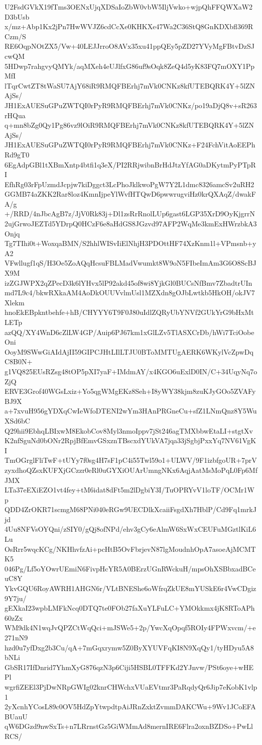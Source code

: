U2FsdGVkX19fTms3OENxUjqXDSaIoZbW0vbW5IljVwko+wjpQhFFQWXaW2D3bUsb
x/mz+Abp1Kx2jPn7HwWVJZ6cdCcXe0KHKXe47Wa2C36StQ8GnKDXbfl369RCzm/S
RE6OqpNOtZX5/Vw+40LEJJrroO8AVx35xu41ppQEy5pZD27YVyMgFBtvDzSJcwQM
5HDwp7rahgvyQMYk/aqMXeh4eUJlfxG86uf9sOqk8ZeQ4d5yK83FQ7mOXY1PpMfI
lTqrCwtZT8tWaSU7AjY68iR9RMQFBErhj7mVk0CNKz8kfUTEBQRK4Y+5lZNAjSs/
JH1ExAUESuGPuZWTQI0rPyR9RMQFBErhj7mVk0CNKz/po19aDjQ8v+sR263rHQua
q+mn8bZg0Qy1Pg86vz9lOiR9RMQFBErhj7mVk0CNKz8kfUTEBQRK4Y+5lZNAjSs/
JH1ExAUESuGPuZWTQI0rPyR9RMQFBErhj7mVk0CNKz+F24FchVitAoEEPhRd9gT0
6EgAdpGBl1tXBmXntp4btfi1q3eX/PI2RRjwibnBrHdJtzYfAG0aDKytmPyPTpRI
EfhRg03rFpUzmdJcpjw7kiDggct3LcPhoJklkwoPgW7Y2L1dmc8326amcSv2uRH2
GGMB74aZKK2Rar8loz4KmnIjpeYlWvfHTQwD6pwwrugviHz0krQXAqZ/dwakFA/g
+/RRD/4nJbcAgB7z/JjV0Rk83j+Dl1zsRrRnolLUp6gast6LGP35XrD9OyKjgrrN
2ujGrwoJEZTd5YDrpQ0HCzF6e8aHdGS8JGzvd97AFP2WqMe3kmExHWrzbkA3Onjq
Tg7TIhi0t+WoxqaBMN/S2hhlWISvIiElNhjH3PDOttHF74XzKnm1l+VPmsnb+yA2
VFwllugf1qS/H3Oe5ZoAQqHcsuFBLMadVwumkt8W9oN5FIbeImAm3G6O8ScBJX9M
izZGJWPX2qZPecD3k6lYHvx5lP92akd45of8wi8YjkGl0BUCsNfBmv7ZbadtrUIn
md7L9c4/bkwRXkaAM4AoDkOUUVvlmUsl1MZXdn8gOJbLwtkb5HkOH/okJV7Xlekm
hnoEkEBpkntbehfe+hB/CHYYY6T9F0J80uIdlZQRyUbYNVf2GUkYrG9bHxMtLETp
azQQ/XY4WnD6cZlLW4GP/Auip6PJ67km1xGlLZv5TlASXCrDb/hWi7TciOobeOni
OoyM9SWwGiAIdAjII59GIPCJHtLIlLTJU0BToMMTUgAERK6WKylVcZpwDqC8B0N+
g1VQ825EUsRZsg48tOP5pXI7yaF+IMdmAY/x4KGO6uExlD0IN/C+34UqyNq7oZjQ
ERVE3Grof40WGsLxiz+Yo5qgWMgEKz8Seh+I8yWY38kjm8zuKJyGOo5ZVAFyBJ9X
a+7xvuH956gYDXqCwIeWfoDTENI2wYm3HAnPRGneCu+sfZ1LNmQnz8Y5WuXSd6bC
Q29hii9EbhqLBIxwM8EkobCov8Myl3nmoIppv7jSt246agTMXbbwEtaLI+stgtXv
K2nfSguNd0bONr2RpjBfEmvGSxznTBscxdYUkVA7jqa33jSgbjPxxYq7NV61VgKI
TmOGrglFliTwF+tUYy7f0sg4H7sF1pC4i55Twl59o1+ULWV/9F1izbfgoUR+7prV
zyxdhoQZsxKUFXjGCzzr0eRl0uGYXiOUArUmngNKx6AqjAatMsMoPqL0Fp6MfJMX
LTa37eEXiEZO1vt4fey+tM6idat8dFt5m2lDgbiY3I/TuOPRYvV1loTF/OCMr1Wp
QDD4ZrOKR71scmgM68PNi040eRGw9UECDlkXcaiiFsgdXh7HblP/Cd9Fq1mrkJjd
4Uu8NFVsOYQni/zSIY0/gQj8ofNPd/ehv3gCy6eAlmW6SxWxCEUFuMGztlKiL6Lu
OsRrr5wqcKCg/NKHhvfzAi+pcHtB5OvFbrjevN87lgMoudnhOpA7asoeAjMCMTK5
046Pg/Lf5oYOwrUEmiN6FivpHcYR5A0BErzUGnRWckuH/mpsOhXSBbxadBCeuC8Y
YkvGQU6RoyAWRH1AHGN6r/VLtBNEShe6oWfrqZkUE8mYUSkE6r4VwCDgiz9Y7ju/
gEXkaI23wpbLMFkNcq0DTQ7te0FOb27faXuYLFuLC+YMOkkmx4jK8RToAPh60zZx
WM9dk4N1wqJvQPZCtWqQci+mJSWe5+2p/YwcXqOpqf5ROIy4FPWxvcm/+e271nN9
hzd0u7yfDxg2b3Cu/qA+7mGqxrymw5Z0ByXYUVFqKI8N9XqQy1/tyHDyu5A8bNLi
GbSR17IfDnrid7YhmXyG876qzN3p6Ciji5HSBL0TFFKd2YJnvw/PSt6oye+wHEPl
wgrfiZEEl3PjDwNRpGWIg02knrCHWchxVUaEVtmr3PaRqdyQr6Jip7eKobK1vlp1
2yXcnhYCosL89c0OV5HdZpYtwpdtpAiJRnZxktZvmmDAKCWu+9Wv1JCoEFABUauU
qW6DGzd9nwSxTs+n7LRrnstGz5GiWMmAd8mernIRE6Flra2oxnBZDSo+PwLlRCS/
